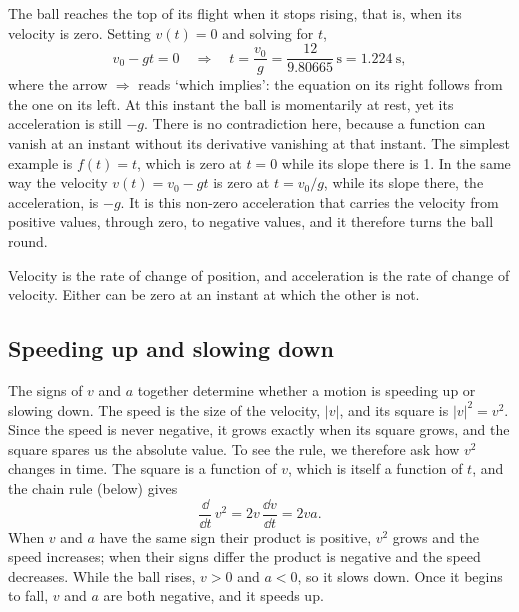 The ball reaches the top of its flight when it stops rising, that is, when
its velocity is zero. Setting $v(t) = 0$ and solving for $t$,
\begin{equation*}
   v_0 - g t = 0
   \quad\Longrightarrow\quad
   t = \frac{v_0}{g} = \frac{12}{9.80665}\,\si{\second}
   = \SI{1.224}{\second},
\end{equation*}
where the arrow $\Longrightarrow$ reads `which implies': the equation on
its right follows from the one on its left.
At this instant the ball is momentarily at rest, yet its acceleration is
still $-g$. There is no contradiction here, because a function can vanish
at an instant without its derivative vanishing at that instant. The
simplest example is $f(t) = t$, which is zero at $t = 0$ while its slope
there is 1. In the same way the velocity $v(t) = v_0 - gt$ is zero at $t =
v_0/g$, while its slope there, the acceleration, is $-g$. It is this
non-zero acceleration that carries the velocity from positive values,
through zero, to negative values, and it therefore turns the ball round.

\begin{keyidea}
Velocity is the rate of change of position, and acceleration is the rate
of change of velocity. Either can be zero at an instant at which the other
is not.
\end{keyidea}

\subsection*{Speeding up and slowing down}

The signs of $v$ and $a$ together determine whether a motion is speeding
up or slowing down. The speed is the size of the velocity, $\lvert
v\rvert$, and its square is $\lvert v\rvert^2 = v^2$. Since the speed is
never negative, it grows exactly when its square grows, and the square
spares us the absolute value. To see the rule, we therefore ask how $v^2$
changes in time. The square is a function of $v$, which is itself a
function of $t$, and the chain rule (below) gives
\begin{equation*}
   \frac{\dd}{\dd t}\,v^2 = 2v\,\frac{\dd v}{\dd t} = 2va .
\end{equation*}
When $v$ and $a$ have the same sign their product is positive, $v^2$
grows and the speed increases; when their signs differ the product is
negative and the speed decreases. While the ball rises, $v > 0$ and $a <
0$, so it slows down. Once it begins to fall, $v$ and $a$ are both
negative, and it speeds up.

